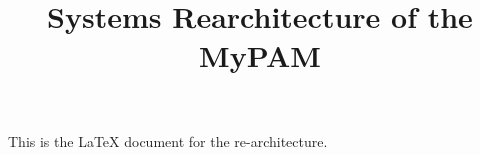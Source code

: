 \documentclass[11pt]{article}
\title{Systems Rearchitecture of the MyPAM}
\date{\vspace{-5ex}} %
\begin{document}
\maketitle
\onehalfspacing
This is the LaTeX document for the re-architecture. 
\end{document}
